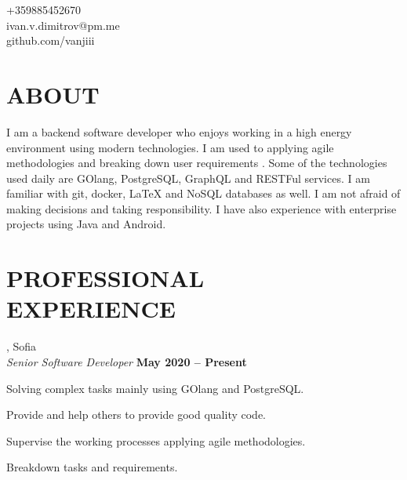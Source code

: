 \documentclass[margin,line]{resume}
\begin{document}
{
    \sc
    \hfill +359885452670		\vspace{0mm}\\\vspace{0mm}%
    \hfill ivan.v.dimitrov@pm.me        \vspace{0mm}\\\vspace{0mm}%
    \hfill github.com/vanjiii		\vspace{0mm}\\\vspace{-10mm}%
}

\begin{resume}
\vspace{1mm}

\section{\mysidestyle\textbf{\large{A}\small{BOUT}}}

    I am a backend software developer who enjoys working in a high
    energy environment using modern technologies. I am used to
    applying agile methodologies and breaking down user requirements \iffalse into
    tasks, teaching junior developers \fi . Some of the technologies used
    daily are GOlang, PostgreSQL, GraphQL and RESTFul services. I am
    familiar with git, docker, LaTeX and NoSQL databases as well. I am
    not afraid of making decisions and taking responsibility. I have
    also experience with enterprise projects using Java and Android.

\sectionline%

    \section{\mysidestyle\textbf{\large{P}\small{ROFESSIONAL\\EXPERIENCE}}}

    \textbf{}, Sofia \vspace{2mm}\\\vspace{1mm}%
    \textsl{Senior Software Developer} \hfill \textbf{May 2020 {--} Present}\\
    \begin{list2}
        \item Solving complex tasks mainly using GOlang and PostgreSQL.\@
        \item Provide and help others to provide good quality code.
          \iffalse
        \item Helping and teaching juniors colleagues.
          \fi
	\item Supervise the working processes applying agile methodologies.
        \item Breakdown tasks and requirements.


\end{list2}
\end{resume}
\end{document}
